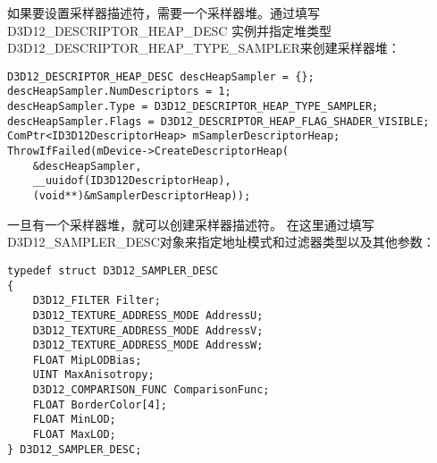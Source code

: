 \begin{flushleft}
如果要设置采样器描述符，需要一个采样器堆。通过填写D3D12\_DESCRIPTOR\_HEAP\_DESC 实例并指定堆类型D3D12\_DESCRIPTOR\_HEAP\_TYPE\_SAMPLER来创建采样器堆：\\
\end{flushleft}

\begin{lstlisting}
D3D12_DESCRIPTOR_HEAP_DESC descHeapSampler = {};
descHeapSampler.NumDescriptors = 1;
descHeapSampler.Type = D3D12_DESCRIPTOR_HEAP_TYPE_SAMPLER;
descHeapSampler.Flags = D3D12_DESCRIPTOR_HEAP_FLAG_SHADER_VISIBLE;
ComPtr<ID3D12DescriptorHeap> mSamplerDescriptorHeap;
ThrowIfFailed(mDevice->CreateDescriptorHeap(
    &descHeapSampler,
    __uuidof(ID3D12DescriptorHeap),
    (void**)&mSamplerDescriptorHeap));
\end{lstlisting}

\begin{flushleft}
一旦有一个采样器堆，就可以创建采样器描述符。 在这里通过填写D3D12\_SAMPLER\_DESC对象来指定地址模式和过滤器类型以及其他参数：\\
\end{flushleft}

\begin{lstlisting}
typedef struct D3D12_SAMPLER_DESC
{
    D3D12_FILTER Filter;
    D3D12_TEXTURE_ADDRESS_MODE AddressU;
    D3D12_TEXTURE_ADDRESS_MODE AddressV;
    D3D12_TEXTURE_ADDRESS_MODE AddressW;
    FLOAT MipLODBias;
    UINT MaxAnisotropy;
    D3D12_COMPARISON_FUNC ComparisonFunc;
    FLOAT BorderColor[4];
    FLOAT MinLOD;
    FLOAT MaxLOD;
} D3D12_SAMPLER_DESC;
\end{lstlisting}


